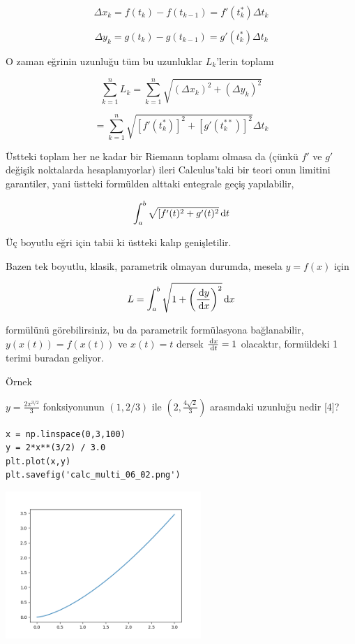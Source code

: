 \documentclass[12pt,fleqn]{article}\usepackage{../../common}
\begin{document}
$$
\Delta x_k = f(t_k) - f(t_{k-1}) = f'(t_k^\ast) \Delta t_k
$$

$$
\Delta y_k = g(t_k) - g(t_{k-1}) = g'(t_k^\ast) \Delta t_k
$$

O zaman eğrinin uzunluğu tüm bu uzunluklar $L_k$'lerin toplamı 

$$
\sum_{k=1}^{n} L_k = \sum_{k=1}^{n} \sqrt{(\Delta x_k)^2 + (\Delta y_k)^2} 
$$

$$
= \sum_{k=1}^{n} \sqrt{[f'(t_k^\ast)]^2 + [g'(t_k^{\ast\ast})]^2} \Delta t_k
$$

Üstteki toplam her ne kadar bir Riemann toplamı olmasa da (çünkü $f'$ ve $g'$
değişik noktalarda hesaplanıyorlar) ileri Calculus'taki bir teori onun limitini
garantiler, yani üstteki formülden alttaki entegrale geçiş yapılabilir,

$$
\int_{a}^{b} \sqrt{[f'(t)^2 + g'(t)^2} \,\mathrm{d} t
$$

Üç boyutlu eğri için tabii ki üstteki kalıp genişletilir.

Bazen tek boyutlu, klasik, parametrik olmayan durumda, mesela $y = f(x)$ için

$$
L = \int_{a}^{b} \sqrt{1 + \left( \frac{\,\mathrm{d} y}{\,\mathrm{d} x} \right)^2} \,\mathrm{d} x 
$$

formülünü görebilirsiniz, bu da parametrik formülasyona bağlanabilir, $y(x(t))
= f(x(t))$ ve $x(t) = t$ dersek $\frac{\,\mathrm{d} x}{\,\mathrm{d} t} = 1$ olacaktır,
formüldeki 1 terimi buradan geliyor.

Örnek

$y = \frac{2 x ^{3/2}}{3}$ fonksiyonunun $(1,2/3)$ ile $(2,\frac{4\sqrt{2}}{3})$ 
arasındaki uzunluğu nedir [4]? 

\begin{verbatim}
x = np.linspace(0,3,100)
y = 2*x**(3/2) / 3.0
plt.plot(x,y)
plt.savefig('calc_multi_06_02.png')
\end{verbatim}

\includegraphics[width=20em]{calc_multi_06_02.png}
\end{document}
